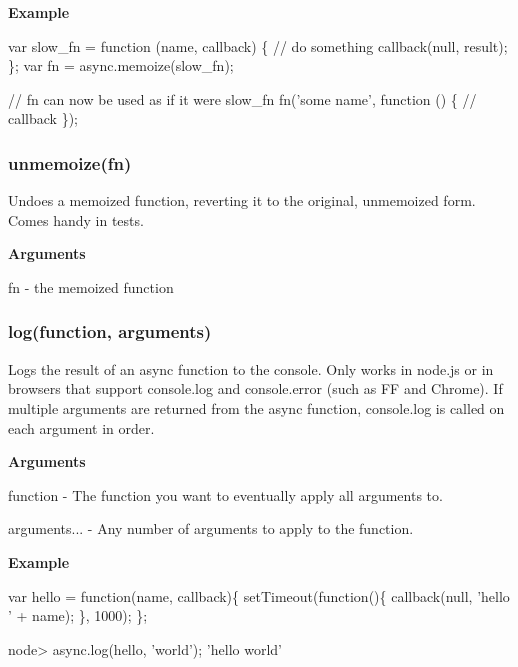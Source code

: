 {\bfseries Example}


\begin{DoxyCode}
var slow\_fn = function (name, callback) \{
    // do something
    callback(null, result);
\};
var fn = async.memoize(slow\_fn);

// fn can now be used as if it were slow\_fn
fn('some name', function () \{
    // callback
\});
\end{DoxyCode}


\label{_unmemoize}%
 \subsubsection*{unmemoize(fn)}

Undoes a memoized function, reverting it to the original, unmemoized form. Comes handy in tests.

{\bfseries Arguments}


\begin{DoxyItemize}
\item fn -\/ the memoized function
\end{DoxyItemize}

\label{_log}%
 \subsubsection*{log(function, arguments)}

Logs the result of an async function to the console. Only works in node.\+js or in browsers that support console.\+log and console.\+error (such as FF and Chrome). If multiple arguments are returned from the async function, console.\+log is called on each argument in order.

{\bfseries Arguments}


\begin{DoxyItemize}
\item function -\/ The function you want to eventually apply all arguments to.
\item arguments... -\/ Any number of arguments to apply to the function.
\end{DoxyItemize}

{\bfseries Example}


\begin{DoxyCode}
var hello = function(name, callback)\{
    setTimeout(function()\{
        callback(null, 'hello ' + name);
    \}, 1000);
\};
\end{DoxyCode}
 
\begin{DoxyCode}
node> async.log(hello, 'world');
'hello world'
\end{DoxyCode}
 



